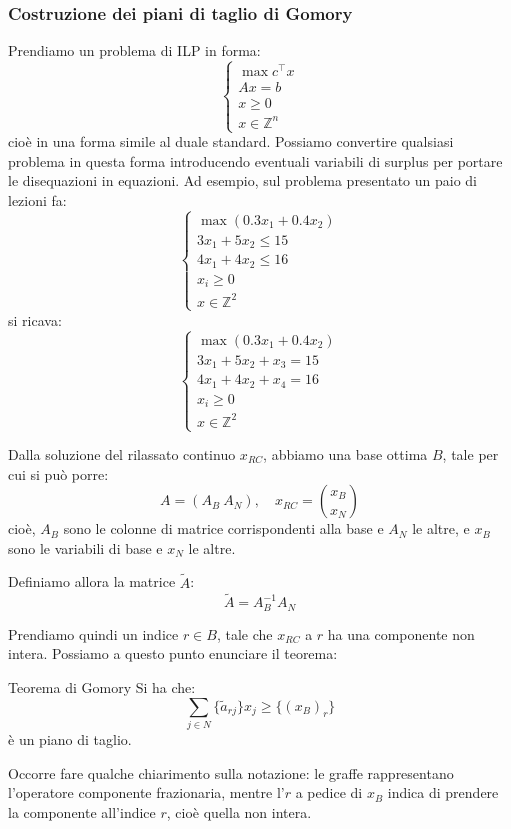 \documentclass[a4paper,11pt]{article}
\begin{document}
\subsubsection{Costruzione dei piani di taglio di Gomory}
Prendiamo un problema di ILP in forma:
\[
	\begin{cases}
		\max c^\intercal x \\ 
		Ax = b \\ 
		x \geq 0 \\ 
		x \in \mathbb{Z}^n
	\end{cases}
\]
cioè in una forma simile al duale standard.
Possiamo convertire qualsiasi problema in questa forma introducendo eventuali variabili di surplus per portare le disequazioni in equazioni.
Ad esempio, sul problema presentato un paio di lezioni fa:
\[
	\begin{cases}
		\max (0.3x_1 + 0.4x_2) \\ 
		3 x_1 + 5 x_2 \leq 15 \\ 
		4 x_1 + 4 x_2 \leq 16 \\ 
		x_i \geq 0 \\ 
		x \in \mathbb{Z}^2
	\end{cases}
\]
si ricava:
\[
	\begin{cases}
		\max (0.3x_1 + 0.4x_2) \\ 
		3 x_1 + 5 x_2 + x_3 = 15 \\ 
		4 x_1 + 4 x_2 + x_4 = 16 \\ 
		x_i \geq 0 \\ 
		x \in \mathbb{Z}^2
	\end{cases}
\]

Dalla soluzione del rilassato continuo $x_{RC}$, abbiamo una base ottima $B$, tale per cui si può porre:
$$
A = (A_B \  A_N), \quad x_{RC} = \binom{x_B}{x_N}
$$
cioè, $A_B$ sono le colonne di matrice corrispondenti alla base e $A_N$ le altre, e $x_B$ sono le variabili di base e $x_N$ le altre. 

Definiamo allora la matrice $\tilde{A}$:
$$ \tilde{A} = A_B^{-1} A_N $$

Prendiamo quindi un indice $r \in B$, tale che $x_{RC}$ a $r$ ha una componente non intera.
Possiamo a questo punto enunciare il teorema:

\begin{theorem}{Teorema di Gomory}
	Si ha che:
	$$
		\sum_{j \in N} \{ \tilde{a}_{rj} \} x_j \geq \{ ( x_{B} )_r \}
	$$
	è un piano di taglio.
\end{theorem}

Occorre fare qualche chiarimento sulla notazione: le graffe rappresentano l'operatore componente frazionaria, mentre l'$r$ a pedice di $x_{B}$ indica di prendere la componente all'indice $r$, cioè quella non intera.
\end{document}
